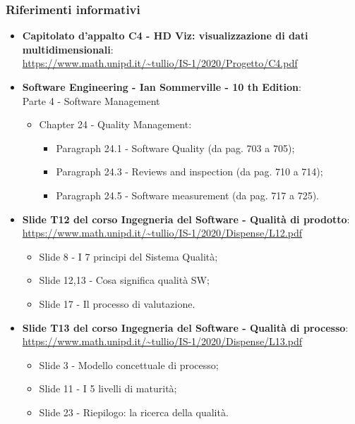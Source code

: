 \subsubsection{Riferimenti informativi}
\begin{itemize}
	\item \textbf{Capitolato d'appalto C4 - HD Viz: visualizzazione di dati multidimensionali}:\\
	\textcolor{blue}{\url{https://www.math.unipd.it/~tullio/IS-1/2020/Progetto/C4.pdf}}

	\item \textbf{Software Engineering - Ian Sommerville - 10 th Edition}: \\
	Parte 4 - Software Management
	\begin{itemize}
	\item Chapter 24 - Quality Management:
		\begin{itemize}
			\item Paragraph 24.1 - Software Quality (da pag. 703 a 705);
			\item Paragraph 24.3 - Reviews and inspection (da pag. 710 a 714);
			\item Paragraph 24.5 - Software measurement (da pag. 717 a 725).
		\end{itemize}
	\end{itemize}
	
	\item \textbf{Slide T12 del corso Ingegneria del Software - Qualità di prodotto}:\\
	\textcolor{blue}{\url{https://www.math.unipd.it/~tullio/IS-1/2020/Dispense/L12.pdf}}
	\begin{itemize}
		\item Slide 8 - I 7 principi del Sistema Qualità;
		\item Slide 12,13 - Cosa significa qualità SW;
		\item Slide 17 - Il processo di valutazione.
	\end{itemize}
	
	\item \textbf{Slide T13 del corso Ingegneria del Software - Qualità di processo}:\\
	\textcolor{blue}{\url{https://www.math.unipd.it/~tullio/IS-1/2020/Dispense/L13.pdf}}
		\begin{itemize}
		\item Slide 3 - Modello concettuale di processo;
		\item Slide 11 - I 5 livelli di maturità;
		\item Slide 23 - Riepilogo: la ricerca della qualità.
	\end{itemize}
	

\end{itemize}
